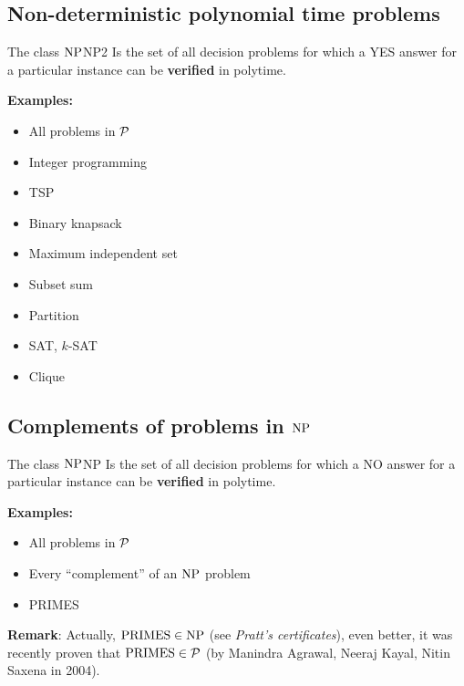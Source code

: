 	\subsection{Non-deterministic polynomial time problems}
	
	\begin{definition}{The class $\mbox{NP}$}{NP2}
Is the set of all decision problems for which a YES answer for a  
particular instance can be {\bf verified} in polytime.
\end{definition}
	
	{\bf Examples:}

\begin{multicols}{2}
\begin{itemize}
\item All problems in ${\mathcal{P}}$
\item Integer programming
\item TSP
\item Binary knapsack
\item Maximum independent set
\item Subset sum
\item Partition
\item SAT, $k$-SAT
\item Clique
\end{itemize}
\end{multicols}
	
	\subsection{Complements of problems in $\mbox{NP}$}
	\begin{definition}{The class $\mbox{NP}$}{NP} 
Is the set of all decision problems for which a NO answer for a  
particular instance can be {\bf verified} in polytime.
\end{definition}

	{\bf Examples:}

\begin{multicols}{2}
\begin{itemize}
\item All problems in ${\mathcal{P}}$
\item Every ``complement'' of an $\mbox{NP}$ problem
\item PRIMES
\end{itemize}
\end{multicols}

{\bf Remark}: Actually, $\textup{PRIMES}\in\mbox{NP}$ (see {\em Pratt's certificates}), even better, it was recently proven that $\textup{PRIMES}\in{\mathcal{P}}$ (by Manindra Agrawal, Neeraj Kayal, Nitin Saxena in 2004).

